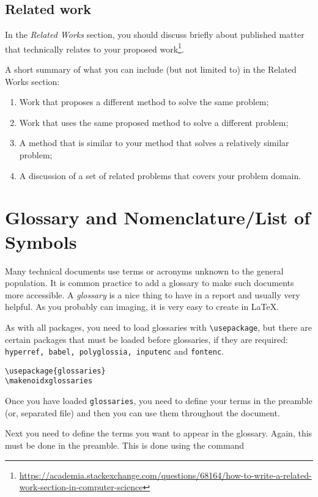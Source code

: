  
\subsection{Related work}
\label{sec:relatedwork}

In the \textit{Related Works} section, you should discuss briefly about published matter that technically relates to your proposed work\footnote{\url{https://academia.stackexchange.com/questions/68164/how-to-write-a-related-work-section-in-computer-science}}.

A short summary of what you can include (but not limited to) in the Related Works section:
\begin{enumerate}
\item Work that proposes a different method to solve the same problem;
\item Work that uses the same proposed method to solve a different problem;
\item A method that is similar to your method that solves a relatively similar problem;
\item A discussion of a set of related problems that covers your problem domain.
\end{enumerate}
    

\section{Glossary and Nomenclature/List of Symbols} %
\label{sec:glossary}

Many technical documents use terms or acronyms unknown to the general population. It is common practice to add a glossary to make such documents more accessible. A \textit{glossary} is a nice thing to have in a report and usually very helpful. As you probably can imaging, it is very easy to create in \LaTeX. 

As with all packages, you need to load glossaries with \verb|\usepackage|, but there are certain packages that must be loaded before glossaries, if they are required: \texttt{hyperref, babel, polyglossia, inputenc} and \texttt{fontenc}.

\begin{verbatim}
\usepackage{glossaries} 
\makenoidxglossaries
\end{verbatim}

Once you have loaded \texttt{glossaries}, you need to define your terms in the preamble (or, separated file) and then you can use them throughout the document. 

Next you need to define the terms you want to appear in the glossary. Again, this must be done in the preamble. This is done using the command

